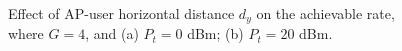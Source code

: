 \documentclass[draftclsnofoot,onecolumn,12pt]{IEEEtran}
\newcommand{\revh}[1]{{\color{black}#1}} %
\newcommand{\revh}[1]{#1}
\begin{document}
\begin{figure}[!t] 
	\centering    
	\revh{\caption{Effect of AP-user horizontal distance $d_y$ on the achievable rate, where $G=4$, and (a) $P_t=0$ dBm; (b) $P_t=20$ dBm.}}     
	\label{dist}     
\end{figure}
\end{document}
